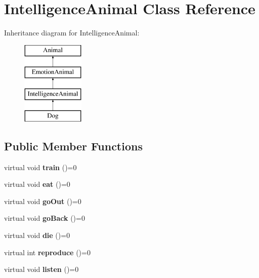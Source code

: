 \hypertarget{class_intelligence_animal}{}\section{Intelligence\+Animal Class Reference}
\label{class_intelligence_animal}
Inheritance diagram for Intelligence\+Animal\+:\begin{figure}[H]
\begin{center}
\leavevmode
\includegraphics[height=4.000000cm]{class_intelligence_animal}
\end{center}
\end{figure}
\subsection*{Public Member Functions}
\begin{DoxyCompactItemize}
\item 
\mbox{\label{class_intelligence_animal_a3d1742ff1c76aed9394748f11d5d8789}} 
virtual void {\bfseries train} ()=0
\item 
\mbox{\label{class_intelligence_animal_aeb924c39e9496e3775b0ef2af35c638f}} 
virtual void {\bfseries eat} ()=0
\item 
\mbox{\label{class_intelligence_animal_af58201f17c0847f0a92154462d1fa627}} 
virtual void {\bfseries go\+Out} ()=0
\item 
\mbox{\label{class_intelligence_animal_aa09abbbe91dddc5e37a01d17bc5423e2}} 
virtual void {\bfseries go\+Back} ()=0
\item 
\mbox{\label{class_intelligence_animal_ada72ecbbe6cfcbdf7be0000915f0b69e}} 
virtual void {\bfseries die} ()=0
\item 
\mbox{\label{class_intelligence_animal_ab8374471442da78816c4f082a907b881}} 
virtual int {\bfseries reproduce} ()=0
\item 
\mbox{\label{class_intelligence_animal_aeb33e78d2fa3b5f2e5ef84f5baf916f7}} 
virtual void {\bfseries listen} ()=0
\end{DoxyCompactItemize}
